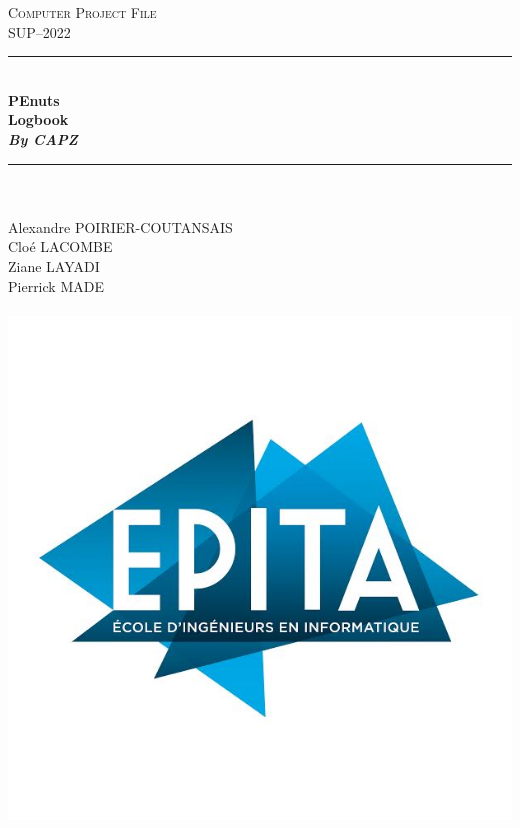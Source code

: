 \documentclass[12pt]{article}
\begin{document}
\begin{titlepage}
\newcommand{\HRule}{\rule{\linewidth}{0.6mm}} %

\center
\textsc{\Large Computer Project File}\\[0.1cm]
\textsc{\large SUP\---2022}\\[0.5cm]

\HRule \\
{ \huge \bfseries {PEnuts} \\
\LARGE Logbook
 \\[0.2cm]
\emph{\large{By CAPZ}}
}\\[0.2cm]
\HRule \\

\flushleft \Large \emph{}\\ 
  Alexandre POIRIER-COUTANSAIS\\
  Cloé LACOMBE\\
  Ziane LAYADI\\
  Pierrick MADE\\ 

\\[0cm] 

\includegraphics[scale = 0.3]{Logo_EPITA.jpg}\\[1cm]


\end{titlepage}
\end{document}
